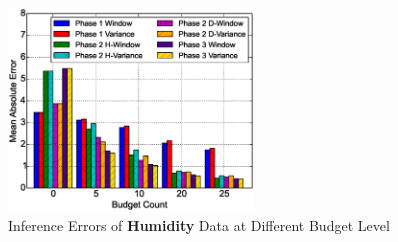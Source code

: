 \documentclass[12pt]{article}  %
\theoremstyle{definition}
\theoremstyle{remark}
\begin{document}
\begin{figure}[H]
\centering
        \includegraphics[width=0.58\textwidth]{../phase3_backinfer/humidity_back_infer_err}
        \caption{Inference Errors of \textbf{Humidity} Data at Different Budget Level}
\label{fig:phase3_back_infer:humidity}
\end{figure}


%
%
%

% 
%


%




\end{document}
